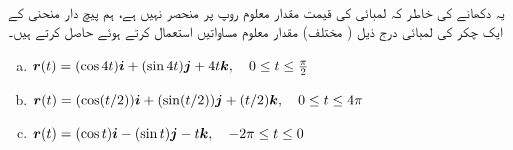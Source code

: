 \\
یہ دکھانے کی خاطر کہ لمبائی کی قیمت مقدار معلوم روپ پر منحصر نہیں ہے، ہم  پیچ دار منحنی کے ایک چکر کی لمبائی درج  ذیل ( مختلف) مقدار معلوم مساواتیں استعمال کرتے ہوئے حاصل کرتے ہیں۔
\begin{enumerate}[a.]
\item
${{\boldsymbol{r}}}(t)=(\cos 4t){\boldsymbol{i}}+(\sin 4t){\boldsymbol{j}}+4t{\boldsymbol{k}},\quad 0\le t\le \tfrac{\pi}{2}$
\item
${{\boldsymbol{r}}}(t)=(\cos (t/2)){\boldsymbol{i}}+(\sin (t/2)){\boldsymbol{j}}+(t/2){\boldsymbol{k}},\quad 0\le t\le 4\pi$
\item
${{\boldsymbol{r}}}(t)=(\cos t){\boldsymbol{i}}-(\sin t){\boldsymbol{j}}-t{\boldsymbol{k}},\quad -2\pi \le t\le 0$
\end{enumerate}

